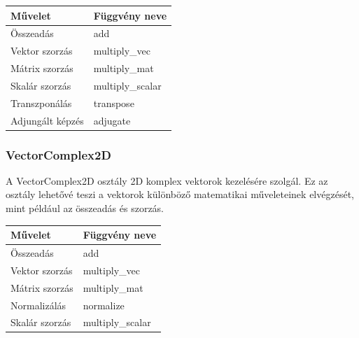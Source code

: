\documentclass[fontsize=12pt,a4paper]{article}
\begin{document}
\begin{table}[h!]
    \centering
    \begin{tabular}{|p{6cm}|p{10cm}|}
        \hline
        \textbf{Művelet} & \textbf{Függvény neve} \\ \hline
        Összeadás & add \\ \hline
        Vektor szorzás & multiply\_vec \\ \hline
        Mátrix szorzás & multiply\_mat \\ \hline
        Skalár szorzás & multiply\_scalar \\ \hline
        Transzponálás & transpose \\ \hline
        Adjungált képzés & adjugate \\ \hline
    \end{tabular}
\end{table}

\subsubsection{VectorComplex2D}

A VectorComplex2D osztály 2D komplex vektorok kezelésére szolgál. Ez az osztály lehetővé teszi a vektorok különböző matematikai műveleteinek elvégzését, mint például az összeadás és szorzás.

\begin{table}[h!]
    \centering
\end{table}

\begin{table}[h!]
    \centering
    \begin{tabular}{|p{6cm}|p{10cm}|}
        \hline
        \textbf{Művelet} & \textbf{Függvény neve} \\ \hline
        Összeadás & add \\ \hline
        Vektor szorzás & multiply\_vec \\ \hline
        Mátrix szorzás & multiply\_mat \\ \hline
        Normalizálás & normalize \\ \hline
        Skalár szorzás & multiply\_scalar \\ \hline
    \end{tabular}
\end{table}
\end{document}
